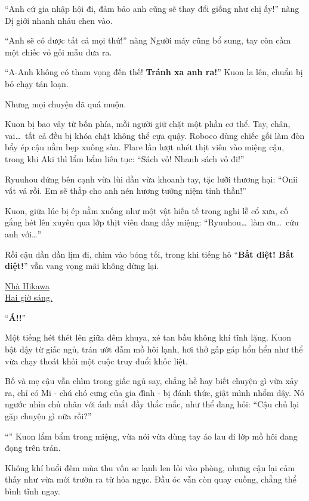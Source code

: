 \documentclass[../main.tex]{subfiles}
\begin{document}
``Anh cứ gia nhập hội đi, đảm bảo anh cũng sẽ thay đổi giống như chị ấy!'' nàng Dị giới nhanh nhảu chen vào.

``Anh sẽ có được tất cả mọi thứ!'' nàng Người máy cũng bổ sung, tay còn cầm một chiếc vỏ gối mẫu đưa ra.

``A-Anh không có tham vọng đến thế! \textbf{Tránh xa anh ra!}'' Kuon la lên, chuẩn bị bỏ chạy tán loạn.

Nhưng mọi chuyện đã quá muộn.

Kuon bị bao vây từ bốn phía, mỗi người giữ chặt một phần cơ thể. Tay, chân, vai\dots\ tất cả đều bị khóa chặt không thể cựa quậy. Roboco dùng chiếc gối làm đòn bẩy ép cậu nằm bẹp xuống sàn. Flare lần lượt nhét thịt viên vào miệng cậu, trong khi Aki thì lẩm bẩm liên tục: ``Sách vỏ! Nhanh sách vỏ đi!''

Ryuuhou đứng bên cạnh vừa lùi dần vừa khoanh tay, tặc lưỡi thương hại: ``Onii vất vả rồi. Em sẽ thắp cho anh nén hương tưởng niệm tinh thần!''

Kuon, giữa lúc bị ép nằm xuống như một vật hiến tế trong nghi lễ cổ xưa, cố gắng hét lên xuyên qua lớp thịt viên đang đầy miệng: ``Ryuuhou\dots\ làm ơn\dots\ cứu anh với\dots''

Rồi cậu dần dần lịm đi, chìm vào bóng tối, trong khi tiếng hô ``\textbf{Bất diệt! Bất diệt!}'' vẫn vang vọng mãi không dừng lại.

\ct

\begin{center}
  \uline{Nhà Hikawa\\Hai giờ sáng.}
\end{center}

``\textbf{Á!!}''

Một tiếng hét thét lên giữa đêm khuya, xé tan bầu không khí tĩnh lặng. Kuon bật dậy từ giấc ngủ, trán ướt đẫm mồ hôi lạnh, hơi thở gấp gáp hổn hển như thể vừa chạy thoát khỏi một cuộc truy đuổi khốc liệt.

Bố và mẹ cậu vẫn chìm trong giấc ngủ say, chẳng hề hay biết chuyện gì vừa xảy ra, chỉ có Mi - chú chó cưng của gia đình - bị đánh thức, giật mình nhổm dậy. Nó ngước nhìn chủ nhân với ánh mắt đầy thắc mắc, như thể đang hỏi: ``Cậu chủ lại gặp chuyện gì nữa rồi?''

``'' Kuon lẩm bẩm trong miệng, vừa nói vừa dùng tay áo lau đi lớp mồ hôi đang đọng trên trán.

Không khí buổi đêm mùa thu vốn se lạnh len lỏi vào phòng, nhưng cậu lại cảm thấy như vừa mới trườn ra từ hỏa ngục. Đầu óc vẫn còn quay cuồng, chẳng thể bình tĩnh ngay.
\end{document}
